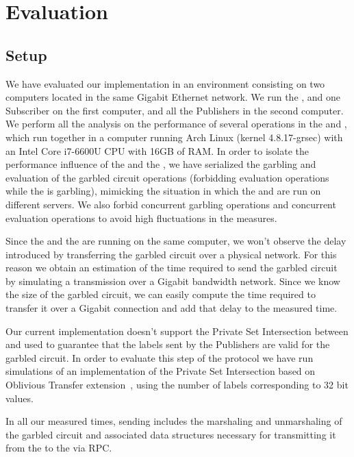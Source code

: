 \section{Evaluation}
\label{sec:evaluation}

\subsection{Setup}

We have evaluated our implementation in an environment consisting on two
computers located in the same Gigabit Ethernet network.  We run the \broker,
\garbler and one Subscriber on the first computer, and all the Publishers in
the second computer.  We perform all the analysis on the performance of several
operations in the \broker and \garbler, which run together in a computer
running Arch Linux (kernel 4.8.17-grsec) with an Intel Core i7-6600U CPU with
16GB of RAM.  In order to isolate the performance influence of the \broker and
the \garbler, we have serialized the garbling and evaluation of the garbled
circuit operations (forbidding evaluation operations while the \garbler is
garbling), mimicking the situation in which the \broker and \garbler are run on
different servers.  We also forbid concurrent garbling operations and
concurrent evaluation operations to avoid high fluctuations in the measures.

Since the \broker and the \garbler are running on the same computer, we won't
observe the delay introduced by transferring the garbled circuit over a
physical network.  For this reason we obtain an estimation of the time required
to send the garbled circuit by simulating a transmission over a Gigabit
bandwidth network.  Since we know the size of the garbled circuit, we can
easily compute the time required to transfer it over a Gigabit connection and
add that delay to the measured time.

Our current implementation doesn't support the Private Set Intersection between
\broker and \garbler used to guarantee that the labels sent by the Publishers
are valid for the garbled circuit.  In order to evaluate this step of the
protocol we have run simulations of an implementation of the Private Set
Intersection based on Oblivious Transfer extension~\cite{Pinkas0Z14}, using the
number of labels corresponding to 32 bit values.

In all our measured times, sending includes the marshaling and unmarshaling of
the garbled circuit and associated data structures necessary for transmitting
it from the \garbler to the \broker via RPC.

